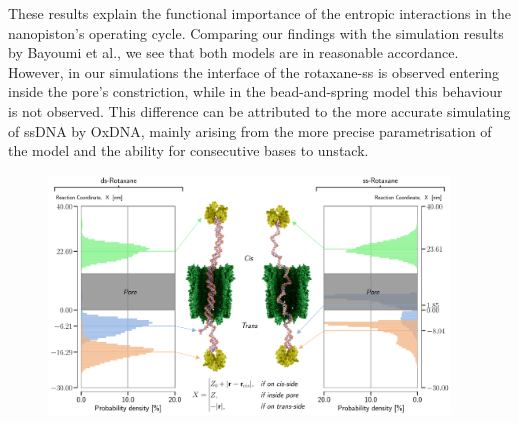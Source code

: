 These results explain the functional importance of the entropic interactions in the
nanopiston's operating cycle. Comparing our findings with the simulation results by
Bayoumi et al., we see that both models are in reasonable accordance. However, in our
simulations the interface of the rotaxane-ss is observed entering inside the pore's
constriction, while in the bead-and-spring model this behaviour is not observed. This
difference can be attributed to the more accurate simulating of ssDNA by OxDNA, mainly
arising from the more precise parametrisation of the model and the ability for
consecutive bases to unstack.

\begin{figure}[ht!]
\begin{center}
  \includegraphics[width=0.95\textwidth]{Figures/image.png}
   \caption[Conformational fluctuations of the ss- and
ds-rotaxane.]{}
\label{fig:conform}
\end{center}
\end{figure}
